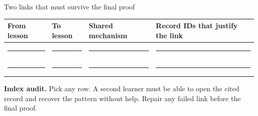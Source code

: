 \begin{teloscard}{Two links that must survive the final proof}
\begin{tabularx}{\linewidth}{@{}p{.16\linewidth}p{.18\linewidth}p{.23\linewidth}L@{}}
\toprule
\textbf{From lesson}&\textbf{To lesson}&\textbf{Shared mechanism}&
\textbf{Record IDs that justify the link}\\
\midrule
\rule{.8\linewidth}{.3pt}&\rule{.8\linewidth}{.3pt}&
\rule{.9\linewidth}{.3pt}&\rule{.95\linewidth}{.3pt}\\[.45em]
\rule{.8\linewidth}{.3pt}&\rule{.8\linewidth}{.3pt}&
\rule{.9\linewidth}{.3pt}&\rule{.95\linewidth}{.3pt}\\
\bottomrule
\end{tabularx}
\end{teloscard}

\smallskip
{\footnotesize\textbf{Index audit.} Pick any row. A second learner must be able
to open the cited record and recover the pattern without help. Repair any
failed link before the final proof.}

